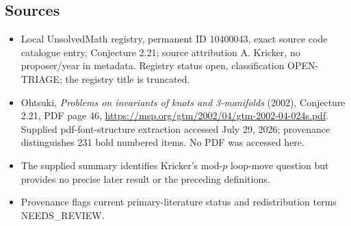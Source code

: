 \documentclass[11pt]{article}
\begin{document}
\subsection{Sources}
\begin{itemize}
\item Local UnsolvedMath registry, permanent ID 10400043, exact source code catalogue entry, Conjecture 2.21; source attribution A. Kricker, no proposer/year in metadata. Registry status open, classification OPEN-TRIAGE; the registry title is truncated.
\item Ohtsuki, \emph{Problems on invariants of knots and 3-manifolds} (2002), Conjecture 2.21, PDF page 46, \url{https://msp.org/gtm/2002/04/gtm-2002-04-024s.pdf}. Supplied pdf-font-structure extraction accessed July 29, 2026; provenance distinguishes 231 bold numbered items. No PDF was accessed here.
\item The supplied summary identifies Kricker's mod-$p$ loop-move question but provides no precise later result or the preceding definitions.
\item Provenance flags current primary-literature status and redistribution terms NEEDS\_REVIEW.
\end{itemize}
\end{document}
